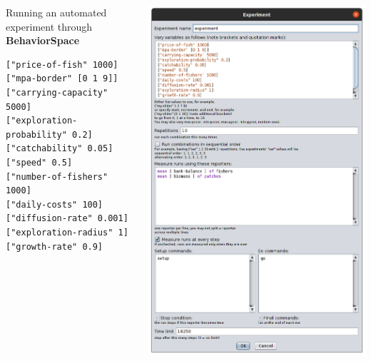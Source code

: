 \documentclass[table, 14pt, aspectratio=169]{beamer}
\newcommand{\hl}[1]{\textcolor{OxfordBlue}{\textbf{#1}}}
\begin{document}
\begin{frame}[fragile=singleslide]{}
  \begin{columns}[T]
    \begin{column}{0.5\textwidth}
      {\Large Running an automated experiment through \hl{BehaviorSpace}}
      \vfill
      \small
      \begin{verbatim}
["price-of-fish" 1000]
["mpa-border" [0 1 9]]
["carrying-capacity" 5000]
["exploration-probability" 0.2]
["catchability" 0.05]
["speed" 0.5]
["number-of-fishers" 1000]
["daily-costs" 100]
["diffusion-rate" 0.001]
["exploration-radius" 1]
["growth-rate" 0.9]
      \end{verbatim}

    \end{column}
    \begin{column}{0.5\textwidth}
      \hfill
      \includegraphics[height=0.95\textheight]{images/behavior_space.png}
    \end{column}    
  \end{columns}
\end{frame}
\end{document}
